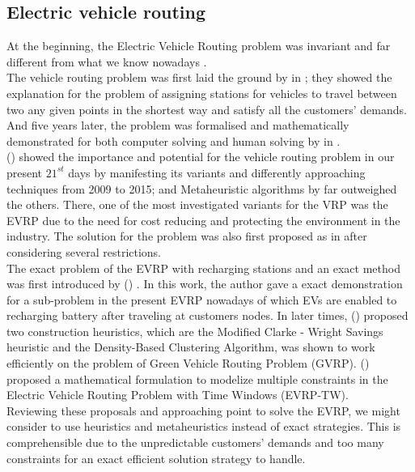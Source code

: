 \documentclass[conference,compsoc]{IEEEtran}
\begin{document}
\subsection{Electric vehicle routing}
At the beginning, the Electric Vehicle Routing problem was invariant and far different from what we know nowadays \cite{evr0}.\\

The vehicle routing problem was first laid the ground by \citeauthor{evr} in \citeyear{evr} \cite{evr}; they showed the explanation for the problem of assigning stations for vehicles to travel between two any given points in the shortest way and satisfy all the customers' demands. And five years later, the problem was formalised and mathematically demonstrated for both computer solving and human solving by \citeauthor{evr2} in \citeyear{evr2} \cite{evr2}.\\

\citeauthor{evr3} (\citeyear{evr3}) \cite{evr3} showed the importance and potential for the vehicle routing problem in our present $21^{st}$ days by manifesting its variants and differently approaching techniques from 2009 to 2015; and Metaheuristic algorithms by far outweighed the others. There, one of the most investigated variants for the VRP was the EVRP due to the need for cost reducing and protecting the environment in the industry. The solution for the problem was also first proposed as in \citeauthor{evr3} after considering several restrictions.\\

The exact problem of the EVRP with recharging stations and an exact method was first introduced by \citeauthor{evr4} (\citeyear{evr4}) \cite{evr4}. In this work, the author gave a exact demonstration for a sub-problem in the present EVRP nowadays of which EVs are enabled to recharging battery after traveling at customers nodes. In later times, \citeauthor{evr5} (\citeyear{evr5}) \cite{evr5} proposed two construction heuristics, which are the Modified Clarke - Wright Savings heuristic and the Density-Based Clustering Algorithm, was shown to work efficiently on the problem of Green Vehicle Routing Problem (GVRP). \citeauthor{evr6} (\citeyear{evr6}) \cite{evr6} proposed a mathematical formulation to modelize multiple constraints in the Electric Vehicle Routing Problem with Time Windows (EVRP-TW).\\

Reviewing these proposals and approaching point to solve the EVRP, we might consider to use heuristics and metaheuristics instead of exact strategies. This is comprehensible due to the unpredictable customers' demands and too many constraints for an exact efficient solution strategy to handle.
\end{document}
